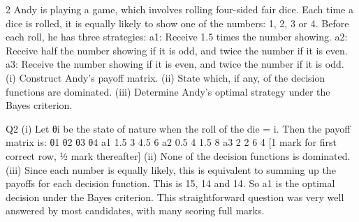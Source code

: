 \documentclass[a4paper,12pt]{article}
\begin{document}
2 Andy is playing a game, which involves rolling four-sided fair dice. Each time a dice is rolled, it is equally likely to show one of the numbers: 1, 2, 3 or 4.
Before each roll, he has three strategies:
  a1: Receive 1.5 times the number showing.
a2: Receive half the number showing if it is odd, and twice the number if it is even.
a3: Receive the number showing if it is even, and twice the number if it is odd.
(i) Construct Andy’s payoff matrix. 
(ii) State which, if any, of the decision functions are dominated. 
(iii) Determine Andy’s optimal strategy under the Bayes criterion. 


Q2 (i) Let θi be the state of nature when the roll of the die = i.
Then the payoff matrix is:
  θ1 θ2 θ3 θ4
a1 1.5 3 4.5 6
a2 0.5 4 1.5 8
a3 2 2 6 4
[1 mark for first correct row, ½ mark thereafter]
(ii) None of the decision functions is dominated. 
(iii) Since each number is equally likely, this is equivalent to summing up the payoffs for each decision function. 
This is 15, 14 and 14. 
So a1 is the optimal decision under the Bayes criterion. 
This straightforward question was very well answered by most candidates, with many scoring full marks.
\end{document}
